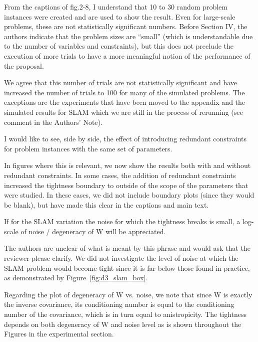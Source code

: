 From the captions of fig.2-8, I understand that 10 to 30 random problem instances were created and are used to show the result. Even for large-scale problems, these are not statistically significant numbers. Before Section IV, the authors indicate that the problem sizes are ``small'' (which is understandable due to the number of variables and constraints), but this does not preclude the execution of more trials to have a more meaningful notion of the performance of the proposal.  
\begin{response}
    We agree that this number of trials are not statistically significant and have increased the number of trials to 100 for many of the simulated problems. The exceptions are the experiments that have been moved to the appendix and the simulated results for SLAM which we are still in the process of rerunning (see comment in the Authors' Note).
\end{response}

I would like to see, side by side, the effect of introducing redundant constraints for problem instances with the same set of parameters.
\begin{response}
    In figures where this is relevant, we now show the results both with and without redundant constraints. In some cases, the addition of redundant constraints increased the tightness boundary to outside of the scope of the parameters that were studied. In these cases, we did not include boundary plots (since they would be blank), but have made this clear in the captions and main text. 
\end{response}

If for the SLAM variation the noise for which the tightness breaks is small, a log-scale of noise / degeneracy of W will be appreciated. 
\begin{response}
    The authors are unclear of what is meant by this phrase and would ask that the reviewer please clarify. We did not investigate the level of noise at which the SLAM problem would become tight since it is far below those found in practice, as demonstrated by Figure~\ref{fig:d3_slam_box}.

    Regarding the plot of degeneracy of W vs. noise, we note that since W is exactly the inverse covariance, its conditioning number is equal to the conditioning number of the covariance, which is in turn equal to anistropicity. The tightness depends on both degeneracy of W and noise level as is shown throughout the Figures in the experimental section. 
\end{response}

